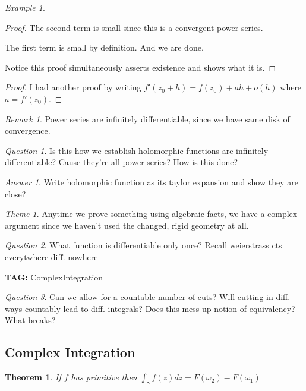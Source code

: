 \documentclass[11pt]{article}
\newtheorem{theorem}{Theorem}
\theoremstyle{remark}
\newtheorem{remark}{Remark}
\newtheorem{quest}{Question}
\newtheorem{ans}{Answer}
\newtheorem{theme}{Theme}
\newtheorem{example}{Example}
\begin{document}
\begin{example}
\begin{proof}
	The second term is small since this is a convergent power series.

	The first term is small by definition. And we are done.

	Notice this proof simultaneously asserts existence and shows what it is.
\end{proof}

\begin{proof}
	I had another proof by writing $f'(z_0 + h) = f(z_0) + ah + o(h)$ where $a = f'(z_0)$.
\end{proof}

\begin{remark}
	Power series are infinitely differentiable, since we have same disk of convergence. 
\end{remark}

\begin{quest}
	Is this how we establish holomorphic functions are infinitely differentiable? Cause they're all power series? How is this done?
\end{quest}

\begin{ans}
	Write holomorphic function as its taylor expansion and show they are close?
\end{ans}

\begin{theme}
	Anytime we prove something using algebraic facts, we have a complex argument since we haven't used the changed, rigid geometry at all.
\end{theme}

\begin{quest}
	What function is differentiable only once? Recall weierstrass cts everytwhere diff. nowhere
\end{quest}

\textbf{TAG:} ComplexIntegration

\begin{quest}
	Can we allow for a countable number of cuts? Will cutting in diff. ways countably lead to diff. integrals? Does this mess up notion of equivalency? What breaks? 
\end{quest}

\subsection{Complex Integration}

\begin{theorem}
	If $f$ has primitive then $\int_{\gamma} f(z)dz = F(\omega_2) - F(\omega_1)$
\end{theorem}


\end{example}
\end{document}
